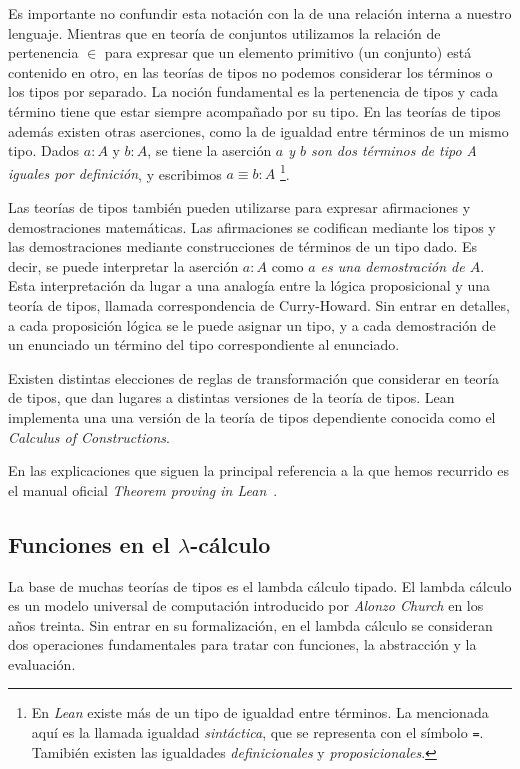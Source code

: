 Es importante no confundir esta notación con la de una relación interna a
nuestro lenguaje. Mientras que en teoría de conjuntos utilizamos la relación de
pertenencia $\in$ para expresar que un elemento primitivo (un conjunto) está
contenido en otro, en las teorías de tipos no podemos considerar los términos o
los tipos por separado. La noción fundamental es la pertenencia de tipos y cada
término tiene que estar siempre acompañado por su tipo. En las teorías de tipos
además existen otras aserciones, como la de igualdad entre términos de un mismo
tipo. Dados $a:A$ y $b:A$, se tiene la aserción \textit{$a$ y $b$ son dos
	términos de tipo A iguales por definición}, y escribimos $a\equiv b : A$
\footnote{En \textit{Lean} existe más de un tipo de igualdad entre términos. La
	mencionada aquí es la llamada igualdad \textit{sintáctica}, que se representa
	con el símbolo \lstinline{=}. Tamibién existen las igualdades
	\textit{definicionales} y \textit{proposicionales}.}.

Las teorías de tipos también pueden utilizarse para expresar afirmaciones y
demostraciones matemáticas. Las afirmaciones se codifican mediante los tipos y
las demostraciones mediante construcciones de términos de un tipo dado. Es
decir, se puede interpretar la aserción $a : A$ como \textit{$a$ es una
	demostración de $A$}. Esta interpretación da lugar a una analogía entre la
lógica proposicional y una teoría de tipos, llamada correspondencia de
Curry-Howard. Sin entrar en detalles, a cada proposición lógica se le puede
asignar un tipo, y a cada demostración de un enunciado un término del tipo
correspondiente al enunciado.

Existen distintas elecciones de reglas de transformación que considerar en
teoría de tipos, que dan lugares a distintas versiones de la teoría de tipos.
Lean implementa una una versión de la teoría de tipos dependiente conocida como
el \textit{Calculus of Constructions}.

En las explicaciones que siguen la principal referencia a la que hemos recurrido
es el manual oficial \textit{Theorem proving in Lean}~\cite{avigadLeanTheoremProver}.

\subsection{Funciones en el $\lambda$-c\'{a}lculo}

La base de muchas teorías de tipos es el lambda cálculo tipado. El lambda
cálculo es un modelo universal de computación introducido por \textit{Alonzo
	Church} en los años treinta. Sin entrar en su formalización, en el lambda
cálculo se consideran dos operaciones fundamentales para tratar con funciones,
la abstracción y la evaluación.

